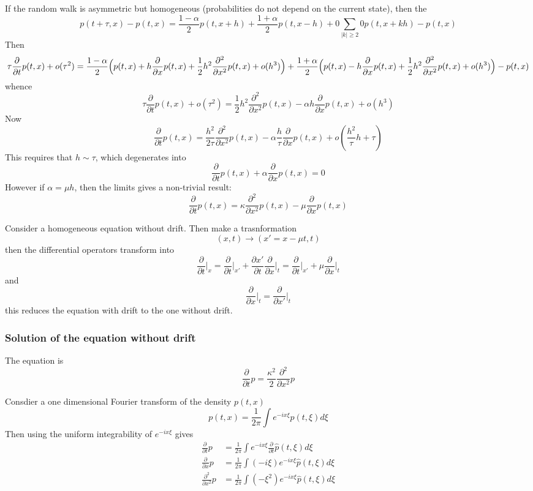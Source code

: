 \documentclass[a4paper]{article}
\begin{document}
If the random walk is asymmetric but homogeneous (probabilities do not depend on
the current state), then the 
\[p(t+\tau, x) - p(t, x) = \frac{1-\alpha}{2} p(t, x + h) + \frac{1+\alpha}{2} p(t, x - h) + 0 \sum_{|k|\geq2} 0 p(t,x+kh) - p(t, x)\]
Then
\[
\tau \frac{\partial}{\partial t} p(t,x) + o(\tau^2)
= \frac{1-\alpha}{2}\Bigl( p(t,x) + h\frac{\partial}{\partial x} p(t,x) + \frac{1}{2}h^2\frac{\partial^2}{\partial x^2} p(t,x) + o(h^3) \Bigr)
+ \frac{1+\alpha}{2}\Bigl( p(t,x) - h\frac{\partial}{\partial x} p(t,x) + \frac{1}{2}h^2\frac{\partial^2}{\partial x^2} p(t,x) + o(h^3) \Bigr)
- p(t,x)
\]
whence
\[
\tau \frac{\partial}{\partial t} p(t,x) + o(\tau^2)
= \frac{1}{2}h^2\frac{\partial^2}{\partial x^2} p(t,x)
- \alpha h\frac{\partial}{\partial x} p(t,x) + o(h^3)
\]
Now
\[
\frac{\partial}{\partial t} p(t,x)
= \frac{h^2}{2\tau}\frac{\partial^2}{\partial x^2} p(t,x)
- \alpha \frac{h}{\tau}\frac{\partial}{\partial x} p(t,x) + o(\frac{h^2}{\tau}h + \tau)
\]
This requires that $h\sim \tau$, which degenerates into
\[ \frac{\partial}{\partial t} p(t,x) + \alpha \frac{\partial}{\partial x} p(t,x) = 0 \]
However if $\alpha = \mu h$, then the limits gives a non-trivial result:
\[
\frac{\partial}{\partial t} p(t,x)
= \kappa \frac{\partial^2}{\partial x^2} p(t,x)
- \mu \frac{\partial}{\partial x} p(t,x)
\]

Consider a homogeneous equation without drift. Then make a trasnformation
\[(x,t)\to(x' = x - \mu t, t)\]
then the differential operators transform into
\[
\frac{\partial}{\partial t}\rvert_x
= \frac{\partial}{\partial t}\rvert_{x'}
+ \frac{\partial x'}{\partial t}\frac{\partial}{\partial x}\rvert_t
= \frac{\partial}{\partial t}\rvert_{x'}
+ \mu \frac{\partial}{\partial x}\rvert_t
\]
and
\[
\frac{\partial}{\partial x}\rvert_t = \frac{\partial}{\partial x'}\rvert_t
\]
this reduces the equation with drift to the one without drift.


\subsubsection{Solution of the equation without drift} %
\label{ssub:solution_of_the_equation_without_drift}

The equation is
\[ \frac{\partial}{\partial t} p = \frac{\kappa^2}{2} \frac{\partial^2}{\partial x^2} p \]

Consdier a one dimensional Fourier transform of the density $p(t,x)$
\[ p(t,x) = \frac{1}{2\pi} \int e^{-i x \xi} \hat{p}(t,\xi) d\xi \]
Then using the uniform integrability of $e^{-ix\xi}$ gives
\begin{align*}
	\frac{\partial}{\partial t} p &= \frac{1}{2\pi} \int e^{-i x \xi} \frac{\partial}{\partial t} \hat{p}(t,\xi) d\xi\\
	\frac{\partial}{\partial x} p &= \frac{1}{2\pi} \int (-i \xi) e^{-i x \xi} \hat{p}(t,\xi) d\xi\\
	\frac{\partial^2}{\partial x^2} p &= \frac{1}{2\pi} \int (- \xi^2) e^{-i x \xi} \hat{p}(t,\xi) d\xi
\end{align*}
\end{document}
